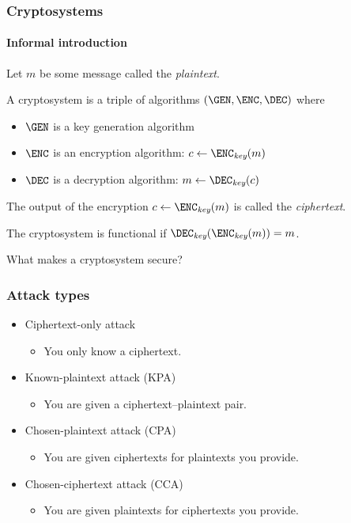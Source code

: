 \begin{frame}
  \frametitle{Cryptosystems}
  \framesubtitle{Informal introduction}

  \pause
  Let $m$ be some message called the \emph{plaintext}.

  \vspace*{1em}

  \pause
  A cryptosystem is a triple of algorithms $(\GEN,\ENC,\DEC)$ where
  \begin{itemize}[<+(1)->]
    \item $\GEN$ is a key generation algorithm
    \item $\ENC$ is an encryption algorithm: $c\gets\ENC_{\textit{key}}(m)$
    \item $\DEC$ is a decryption algorithm: $m\gets\DEC_{\textit{key}}(c)$
  \end{itemize}

  \vspace*{1em}

  \pause
  The output of the encryption $c\gets\ENC_{\textit{key}}(m)$ is called the \emph{ciphertext}.

  \vspace*{1em}

  \pause
  The cryptosystem is functional if $\DEC_{\textit{key}}(\ENC_{\textit{key}}(m))=m$.
\end{frame}

\begin{frame}[c]
  \centering
  What makes a cryptosystem secure?
\end{frame}

\begin{frame}
  \frametitle{Attack types}

  \begin{itemize}[<+(1)->]
    \item Ciphertext-only attack
    \begin{itemize}
      \item You only know a ciphertext.
    \end{itemize}
    \item Known-plaintext attack (KPA)
    \begin{itemize}
      \item You are given a ciphertext--plaintext pair.
    \end{itemize}
    \item Chosen-plaintext attack (CPA)
    \begin{itemize}
      \item You are given ciphertexts for plaintexts you provide.
    \end{itemize}
    \item Chosen-ciphertext attack (CCA)
    \begin{itemize}
      \item You are given plaintexts for ciphertexts you provide.
    \end{itemize}
  \end{itemize}
\end{frame}

